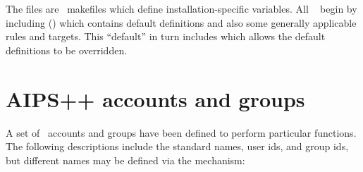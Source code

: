 The  files are \gnu\ makefiles which define
installation-specific variables.  All \aipspp\  begin by
including  () which
contains default definitions and also some generally applicable rules and
targets.  This ``default''  in turn includes
 which allows the default definitions to be
overridden.


\section{AIPS++ accounts and groups}
\label{Accounts and groups}

A set of \aipspp\ accounts and groups have been defined to perform particular
functions.  The following descriptions include the standard names, user ids,
and group ids, but different names may be defined via the 
mechanism:

